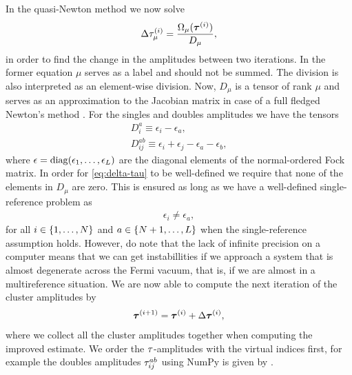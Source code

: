             In the quasi-Newton method we now solve \cite{bartlett-purvis,
            helgaker-molecular}
            \begin{align}
                \Delta \tau^{(i)}_{\mu}
                = \frac{\Omega_{\mu}(\boldsymbol{\tau}^{(i)})}{
                    D_{\mu}
                },
                \label{eq:delta-tau}
            \end{align}
            in order to find the change in the amplitudes between two
            iterations.
            In the former equation $\mu$ serves as a label and should not be
            summed.
            The division is also interpreted as an element-wise division.
            Now, $D_{\mu}$ is a tensor of rank $\mu$ and serves as an
            approximation to the Jacobian matrix in case of a full fledged
            Newton's method \cite{helgaker-molecular}.
            For the singles and doubles amplitudes we have the tensors
            \begin{gather}
                D^{a}_{i} \equiv \epsilon_i - \epsilon_a, \\
                D^{ab}_{ij} \equiv \epsilon_i + \epsilon_j
                - \epsilon_a - \epsilon_b,
            \end{gather}
            where $\epsilon = \operatorname{diag}(\epsilon_1, \dots, \epsilon_L)$ are the
            diagonal elements of the normal-ordered Fock matrix.
            In order for \autoref{eq:delta-tau} to be well-defined we require
            that none of the elements in $D_{\mu}$ are zero.
            This is ensured as long as we have a well-defined single-reference
            problem as
            \begin{align}
                \epsilon_i \neq \epsilon_a,
            \end{align}
            for all $i \in \left\{ 1, \dots, N \right\}$ and $a \in \left\{ N + 1, \dots,
            L \right\}$ when the single-reference assumption holds.
            However, do note that the lack of infinite precision on a computer
            means that we can get instabillities if we approach a system that is
            almost degenerate across the Fermi vacuum, that is, if we are almost
            in a multireference situation.
            We are now able to compute the next iteration of the cluster
            amplitudes by
            \begin{align}
                \boldsymbol{\tau}^{(i + 1)}
                = \boldsymbol{\tau}^{(i)}
                + \Delta \boldsymbol{\tau}^{(i)},
            \end{align}
            where we collect all the cluster amplitudes together when computing
            the improved estimate.
            We order the $\tau$-amplitudes with the virtual indices first,
            for example the doubles amplitudes $\tau^{ab}_{ij}$ using NumPy
            is given by .

